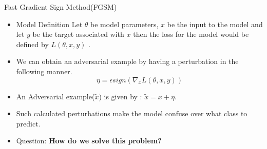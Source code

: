 \documentclass[10pt]{beamer}
\begin{document}
\begin{frame}{Fast Gradient Sign Method(FGSM)}
\begin{itemize}
	
	\item[] { \begin{block}{Model Definition}
		Let $\theta$ be model parameters, $x$ be the input to the model and let $y$ be the target associated with $x$ then the loss for the model would be defined by $L(\theta,x,y)$ .
	\end{block} }
	\pause
	\item[] {We can obtain an adversarial example by having a perturbation in the following manner.  \\
				\begin{equation}
					\eta = \epsilon sign(\nabla_{x} L(\theta, x,y)) 
				\end{equation} 
			
		}
	\pause
	\item[] An Adversarial example($\tilde{x}$) is given by : $\tilde{x} = x + \eta$.  
	\pause
	\item[] Such calculated perturbations make the model confuse over what class to predict.
		
	\item[] {
		\begin{alertblock}{Question:}
			\textbf{\alert{How do we solve this problem?}}
		\end{alertblock}
		
	}

\end{itemize}

\end{frame}
\end{document}
